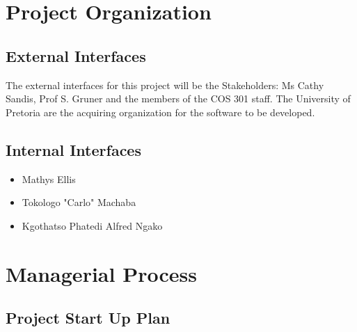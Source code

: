 \documentclass[12pt]{article}
\begin{document}
\newpage
\section{Project Organization}

\subsection{External Interfaces}
The external interfaces for this project will be the Stakeholders: Ms Cathy Sandis, Prof S. Gruner and the members of the COS 301 staff. The University of Pretoria are the acquiring organization for the software to be developed.

\subsection{Internal Interfaces}
\begin{itemize}
\item Mathys Ellis
\item Tokologo "Carlo" Machaba
\item Kgothatso Phatedi Alfred Ngako
\end{itemize}

\section{Managerial Process}
\subsection{Project Start Up Plan}
\end{document}
